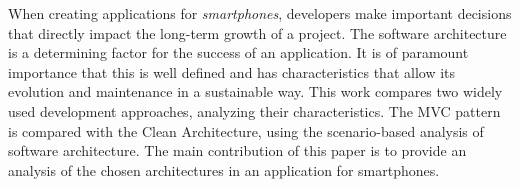When creating applications for \emph{smartphones}, developers make important decisions that directly impact the long-term growth of a project.
The software architecture is a determining factor for the success of an application.
It is of paramount importance that this is well defined and has characteristics that allow its evolution and maintenance in a sustainable way.
This work compares two widely used development approaches, analyzing their characteristics.
The MVC pattern is compared with the Clean Architecture, using the scenario-based analysis of software architecture.
The main contribution of this paper is to provide an analysis of the chosen architectures in an application for smartphones.